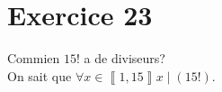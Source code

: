 \part{Exercice 23}
Commien $15!$ a de diviseurs?\\

On sait que $\forall x \in \left\llbracket 1, 15 \right\rrbracket x  \mid (15!)$.

